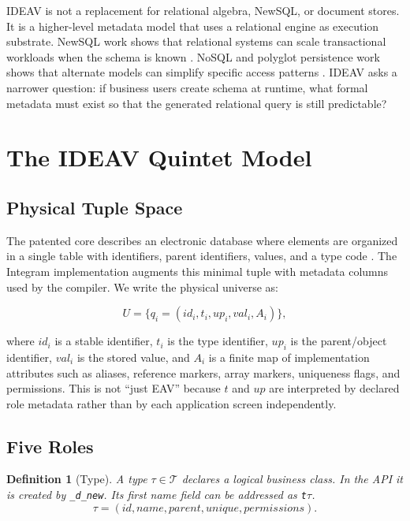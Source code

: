 \documentclass[11pt]{article}
\newtheorem{definition}{Definition}
\begin{document}
IDEAV is not a replacement for relational algebra, NewSQL, or document stores.
It is a higher-level metadata model that uses a relational engine as execution
substrate. NewSQL work shows that relational systems can scale transactional
workloads when the schema is known \citep{pavlo2016newsql}. NoSQL and polyglot
persistence work shows that alternate models can simplify specific access
patterns \citep{sadalage2012nosql,floratou2012nosql}. IDEAV asks a narrower
question: if business users create schema at runtime, what formal metadata must
exist so that the generated relational query is still predictable?

\section{The IDEAV Quintet Model}

\subsection{Physical Tuple Space}

The patented core describes an electronic database where elements are organized
in a single table with identifiers, parent identifiers, values, and a type code
\citep{semenov2018ru,semenov2021us}. The Integram implementation augments this
minimal tuple with metadata columns used by the compiler. We write the physical
universe as:

\[
  U = \{q_i = (id_i, t_i, up_i, val_i, A_i)\},
\]

where \(id_i\) is a stable identifier, \(t_i\) is the type identifier, \(up_i\)
is the parent/object identifier, \(val_i\) is the stored value, and \(A_i\) is a
finite map of implementation attributes such as aliases, reference markers,
array markers, uniqueness flags, and permissions. This is not ``just EAV''
because \(t\) and \(up\) are interpreted by declared role metadata rather than
by each application screen independently.

\subsection{Five Roles}

\begin{definition}[Type]
A type \(\tau \in \mathcal{T}\) declares a logical business class. In the API it
is created by \texttt{\_d\_new}. Its first name field can be addressed as
\texttt{t\(\tau\)}.
\[
  \tau = (id, name, parent, unique, permissions).
\]
\end{definition}
\end{document}
